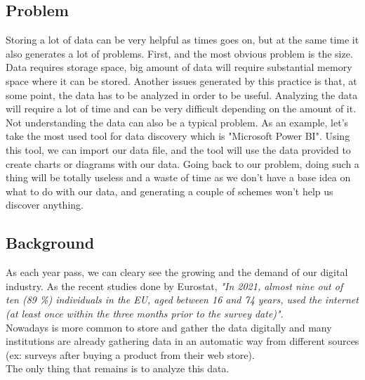 \subsection{Problem}
Storing a lot of data can be very helpful as times goes on, but at the same time it also generates a lot of problems. First, and the most obvious problem is the size. Data requires storage space, big amount of data will require substantial memory space where it can be stored. Another issues generated by this practice is that, at some point, the data has to be analyzed in order to be useful. Analyzing the data will require a lot of time and can be very difficult depending on the amount of it. 
\vspace{5mm} %
\\Not understanding the data can also be a typical problem. As an example, let's take the most used tool for data discovery which is "Microsoft Power BI". Using this tool, we can import our data file, and the tool will use the data provided to create charts or diagrams with our data. Going back to our problem, doing such a thing will be totally useless and a waste of time as we don't have a base idea on what to do with our data, and generating a couple of schemes won't help us discover anything.

\subsection{Background}
As each year pass, we can cleary see the growing and the demand of our digital industry. As the recent studies done by Eurostat, \textit{"In 2021, almost nine out of ten (89 \%) individuals in the EU, aged between 16 and 74 years, used the internet (at least once within the three months prior to the survey date)"}. 
\vspace{5mm} %
\\Nowadays is more common to store and gather the data digitally and many institutions are already gathering data in an automatic way from different sources (ex: surveys after buying a product from their web store). 
\vspace{5mm} %
\\The only thing that remains is to analyze this data.

